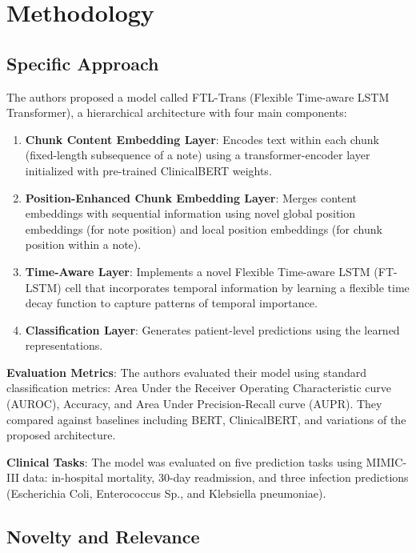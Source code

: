 \documentclass[10pt,letterpaper,twocolumn]{article}
\begin{document}
\section{Methodology}

\subsection{Specific Approach}

The authors proposed a model called FTL-Trans (Flexible Time-aware LSTM Transformer), a hierarchical architecture with four main components:

\begin{enumerate}[leftmargin=*]
    \item \textbf{Chunk Content Embedding Layer}: Encodes text within each chunk (fixed-length subsequence of a note) using a transformer-encoder layer initialized with pre-trained ClinicalBERT weights.
    
    \item \textbf{Position-Enhanced Chunk Embedding Layer}: Merges content embeddings with sequential information using novel global position embeddings (for note position) and local position embeddings (for chunk position within a note).
    
    \item \textbf{Time-Aware Layer}: Implements a novel Flexible Time-aware LSTM (FT-LSTM) cell that incorporates temporal information by learning a flexible time decay function to capture patterns of temporal importance.
    
    \item \textbf{Classification Layer}: Generates patient-level predictions using the learned representations.
\end{enumerate}

\textbf{Evaluation Metrics}: The authors evaluated their model using standard classification metrics: Area Under the Receiver Operating Characteristic curve (AUROC), Accuracy, and Area Under Precision-Recall curve (AUPR). They compared against baselines including BERT, ClinicalBERT, and variations of the proposed architecture.

\textbf{Clinical Tasks}: The model was evaluated on five prediction tasks using MIMIC-III data: in-hospital mortality, 30-day readmission, and three infection predictions (Escherichia Coli, Enterococcus Sp., and Klebsiella pneumoniae).

\subsection{Novelty and Relevance}
\end{document}
